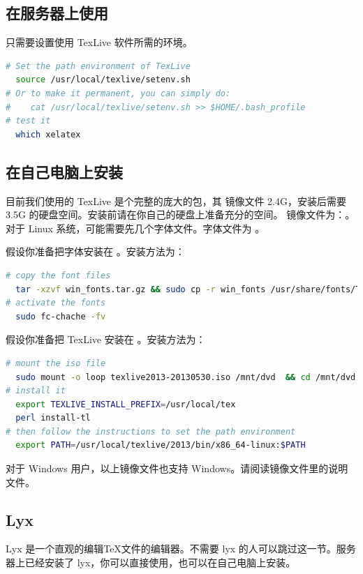 \subsection{在服务器上使用}
只需要设置使用 TexLive 软件所需的环境。
\begin{lstlisting}[language=sh,caption={在服务器上设置使用 TexLive 的环境}]
# Set the path environment of TexLive 
  source /usr/local/texlive/setenv.sh
# Or to make it permanent, you can simply do:
#    cat /usr/local/texlive/setenv.sh >> $HOME/.bash_profile
# test it
  which xelatex
\end{lstlisting}

\subsection{在自己电脑上安装}
目前我们使用的 TexLive 是个完整的庞大的包，其  镜像文件 2.4G，安装后需要 3.5G 的硬盘空间。安装前请在你自己的硬盘上准备充分的空间。
镜像文件为：。
对于 Linux 系统，可能需要先几个字体文件。字体文件为 。

假设你准备把字体安装在 。安装方法为：
\begin{lstlisting}[language=sh,caption={安装字体}]
# copy the font files
  tar -xzvf win_fonts.tar.gz && sudo cp -r win_fonts /usr/share/fonts/TTF/
# activate the fonts
  sudo fc-chache -fv
\end{lstlisting}

假设你准备把 TexLive 安装在  。安装方法为：
\begin{lstlisting}[language=sh,caption={安装 TexLive}]
# mount the iso file
  sudo mount -o loop texlive2013-20130530.iso /mnt/dvd  && cd /mnt/dvd
# install it
  export TEXLIVE_INSTALL_PREFIX=/usr/local/tex
  perl install-tl
# then follow the instructions to set the path environment
  export PATH=/usr/local/texlive/2013/bin/x86_64-linux:$PATH
\end{lstlisting}

对于 Windows 用户，以上镜像文件也支持 Windows。请阅读镜像文件里的说明文件。

\subsection{Lyx}
Lyx 是一个直观的编辑\TeX 文件的编辑器。不需要 lyx 的人可以跳过这一节。服务器上已经安装了 lyx，你可以直接使用，也可以在自己电脑上安装。

